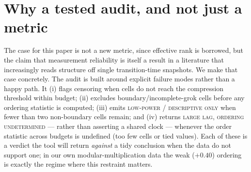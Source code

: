 \documentclass[11pt]{article}
\begin{document}
\begin{table}[!htb]
\centering
\footnotesize
\caption{\textbf{Sensitivity of the audit to its free parameters} (full grid; each parameter varied one
at a time, the rest held at the defaults $\varepsilon=0.10$, floor frac $0.10$, grok thr $0.90$, min drop
$1.0$, gate thr $0.25$). The converged-floor law $\rho_S(\text{floor})=-1.0$ and the boundary gate
(addition excludes $\rho=1.00$; multiplication excludes none) are invariant across all settings; only the
lag coefficient $\mathrm{lag}/T_g$ moves, tracking $\varepsilon$ as expected. ``gated'' lists the budgets
the boundary gate removes before the ordering statistics are computed. Regenerated by
\texttt{sensitivity\_floor\_ci.py}.}
\label{tab:sensitivity}

\end{table}

\section{Why a tested audit, and not just a metric}
The case for this paper is not a new metric, since effective rank is borrowed, but the claim that
measurement reliability is itself a result in a literature that increasingly reads structure off single
transition-time snapshots. We make that case concretely. The audit is built around explicit failure modes
rather than a happy path. It (i) flags censoring when cells do not reach the compression
threshold within budget; (ii) excludes boundary/incomplete-grok cells before any ordering statistic is
computed; (iii) emits \textsc{low-power / descriptive only} when fewer than two non-boundary cells
remain; and (iv) returns \textsc{large lag, ordering undetermined} --- rather than asserting a shared
clock --- whenever the order statistic across budgets is undefined (too few cells or tied values).
Each of these is a verdict the tool will return \emph{against} a tidy conclusion when the data do not
support one; in our own modular-multiplication data the weak ($+0.40$) ordering is exactly the regime
where this restraint matters.
\end{document}
